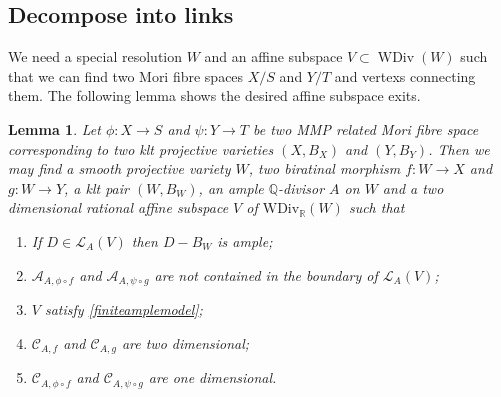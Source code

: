 \documentclass{article}
\newtheorem{lem}[defn]{Lemma}
\begin{document}
\subsection{Decompose into links}
We need a special resolution $W$ and an   affine subspace $V \subset \operatorname{WDiv}(W)$ such that we can find two Mori fibre spaces $X/S$ and $Y/T$ and vertexs connecting them. The following  lemma shows the desired affine subspace exits. 
\begin{lem}\label{keylemma}
  Let $ \phi:X\to S $ and $ \psi :Y\to T  $ be two MMP related Mori fibre space corresponding to two klt projective varieties $ (X,B_X) $ and $ (Y,B_Y) $. Then we may find a smooth projective variety $ W $, two biratinal morphism $ f:W\to X $ and $ g:W\to Y $, a klt pair $ (W,B_{W}) $, an ample $ \mathbb{Q} $-divisor $ A $ on $ W $ and a two dimensional rational affine subspace $ V $ of $ \mathrm{WDiv}_\mathbb{R}(W) $ such that 
  \begin{enumerate}[1)]
    \item If $ D\in \mathcal{L}_A(V) $ then $ D-B_W $ is ample;
    \item $ \mathcal{A}_{A,\phi\circ f} $ and $ \mathcal{A}_{A,\psi\circ g} $ are not contained in the boundary of $ \mathcal{L}_A(V) $;
    \item $ V $ satisfy \ref{finiteamplemodel};
    \item $ \mathcal{C}_{A,f} $ and $ \mathcal{C}_{A,g} $ are two dimensional;
    \item $ \mathcal{C}_{A,\phi\circ f} $ and $ \mathcal{C}_{A,\psi\circ g} $ are one dimensional.
  \end{enumerate}
\end{lem}
\end{document}
